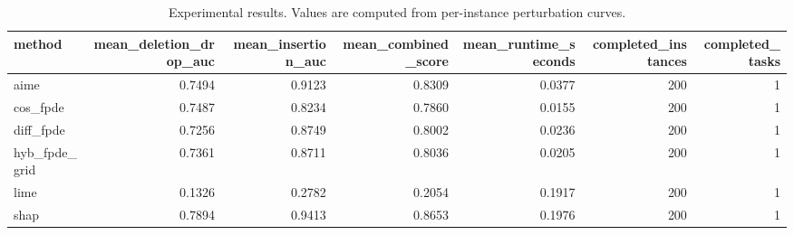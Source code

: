 \begin{table}[t]
\caption{Experimental results. Values are computed from per-instance perturbation curves.}
\label{tab:main_results_computed}
\centering
\begin{tabular}{lrrrrrr}
\toprule
method & mean\_deletion\_drop\_auc & mean\_insertion\_auc & mean\_combined\_score & mean\_runtime\_seconds & completed\_instances & completed\_tasks \\
\midrule
aime & 0.7494 & 0.9123 & 0.8309 & 0.0377 & 200 & 1 \\
cos\_fpde & 0.7487 & 0.8234 & 0.7860 & 0.0155 & 200 & 1 \\
diff\_fpde & 0.7256 & 0.8749 & 0.8002 & 0.0236 & 200 & 1 \\
hyb\_fpde\_grid & 0.7361 & 0.8711 & 0.8036 & 0.0205 & 200 & 1 \\
lime & 0.1326 & 0.2782 & 0.2054 & 0.1917 & 200 & 1 \\
shap & 0.7894 & 0.9413 & 0.8653 & 0.1976 & 200 & 1 \\
\bottomrule
\end{tabular}

\end{table}
